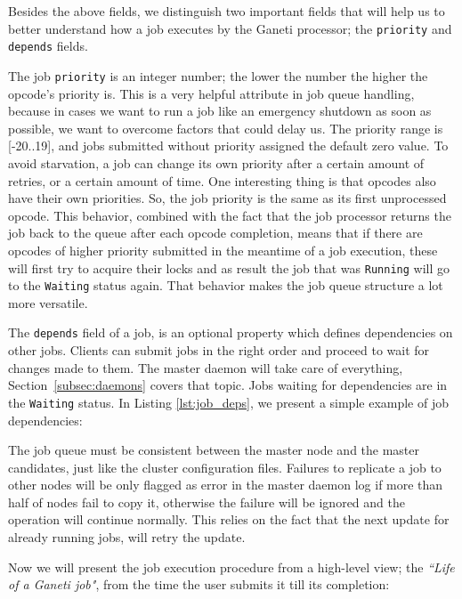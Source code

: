 Besides the above fields, we distinguish two important fields that will help
us to better understand how a job executes by the Ganeti processor; the
\texttt{priority} and \texttt{depends} fields.

The job \texttt{priority} is an integer number; the lower the number the
higher the opcode's priority is. This is a very helpful attribute in job
queue handling, because in cases we want to run a job like an emergency
shutdown as soon as possible, we want to overcome factors that could
delay us. The priority range is [-20..19], and jobs submitted without
priority assigned the default zero value. To avoid starvation, a job can
change its own priority after a certain amount of retries, or a certain
amount of time. One interesting thing is that opcodes also have their own
priorities. So, the job priority is the same as its first unprocessed opcode.
This behavior, combined with the fact that the job processor returns the job
back to the queue after each opcode completion, means that if there are opcodes
of higher priority submitted in the meantime of a job execution, these will
first try to acquire their locks and as result the job that was
\texttt{Running} will go to the \texttt{Waiting} status again. That behavior
makes the job queue structure a lot more versatile.

The \texttt{depends} field of a job, is an optional property which defines
dependencies on other jobs. Clients can submit jobs in the right
order and proceed to wait for changes made to them. The master daemon will
take care of everything, Section~\ref{subsec:daemons} covers that topic. Jobs
waiting for dependencies are in the \texttt{Waiting} status. In Listing
\ref{lst:job_deps}, we present a simple example of job dependencies:


The job queue must be consistent between the master node and the master
candidates, just like the cluster configuration files. Failures to replicate a
job to other nodes will be only flagged as error in the master daemon log if
more than half of nodes fail to copy it, otherwise the failure will be ignored
and the operation will continue normally. This relies on the fact that the
next update for already running jobs, will retry the update.

Now we will present the job execution procedure from a high-level view; the
\emph{``Life of a Ganeti job"}, from the time the user submits it till its
completion:

